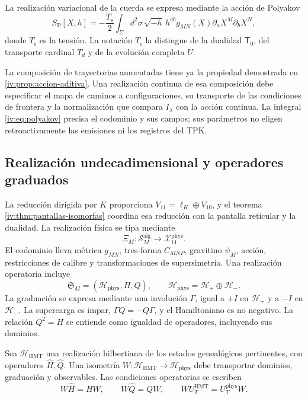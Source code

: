 La realización variacional de la cuerda se expresa mediante
la acción de Polyakov
\begin{equation}
 S_{\mathrm P}[X,h]
 =-\frac{T_{\mathrm s}}2\int_\Sigma d^2\sigma\,
 \sqrt{-h}\,h^{ab}g_{MN}(X)
             \partial_aX^M\partial_bX^N,
 \label{iv:eq:polyakov}
\end{equation}
donde \(T_{\mathrm s}\) es la tensión. La notación
\(T_{\mathrm s}\) la distingue de la dualidad
\(\mathsf T_0\), del transporte cardinal \(T_d\)
y de la evolución completa \(U\).

La composición de trayectorias aumentadas tiene ya la
propiedad demostrada en \ref{iv:prop:accion-aditiva}.
Una realización continua de esa composición debe
especificar el mapa de caminos a configuraciones,
su transporte de las condiciones de frontera y la
normalización que compara \(I_\lambda\) con la acción
continua. La integral \eqref{iv:eq:polyakov} precisa
el codominio y sus campos; sus parámetros no eligen
retroactivamente las emisiones ni los registros del TPK.

\subsection{Realización undecadimensional y operadores graduados}

La reducción dirigida por \(K\) proporciona
\(V_{11}=\ell_K\oplus V_{10}\), y el teorema
\ref{iv:thm:pantallas-isomorfas} coordina esa reducción
con la pantalla reticular y la dualidad. La realización
física se tipa mediante
\[
 \Xi_M:\mathscr S_M^{\mathrm{alg}}
                  \longrightarrow\mathcal X_{11}^{\mathrm{phys}}.
\]
El codominio lleva métrica \(g_{MN}\), tres-forma
\(C_{MNP}\), gravitino \(\psi_M\), acción,
restricciones de calibre y transformaciones de
supersimetría. Una realización operatoria incluye
\[
 \mathfrak S_M=(\mathcal H_{\mathrm{phys}},H,Q),\qquad
 \mathcal H_{\mathrm{phys}}=\mathcal H_+\oplus\mathcal H_-.
\]
La graduación se expresa mediante una involución
\(\Gamma\), igual a \(+I\) en \(\mathcal H_+\)
y a \(-I\) en \(\mathcal H_-\). La supercarga
es impar, \(\Gamma Q=-Q\Gamma\), y el
Hamiltoniano es no negativo. La relación
\(Q^2=H\) se entiende como igualdad de operadores,
incluyendo sus dominios.

Sea \(\mathcal H_{\mathrm{HMT}}\) una realización
hilbertiana de los estados genealógicos pertinentes,
con operadores \(\widehat H,\widehat Q\). Una
isometría \(W:\mathcal H_{\mathrm{HMT}}\to
\mathcal H_{\mathrm{phys}}\) debe transportar
dominios, graduación y observables. Las condiciones
operatorias se escriben
\begin{equation}
 W\widehat H=HW,\qquad
 W\widehat Q=QW,\qquad
 WU_T^{\mathrm{HMT}}=U_T^{\mathrm{phys}}W.
 \label{iv:eq:entrelazamiento-fisico}
\end{equation}

